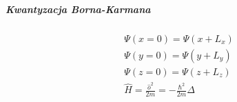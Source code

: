\documentclass{article}
\begin{document}
		\subparagraph{Kwantyzacja Borna-Karmana}
		\begin{equation}
		\begin{array}{cc}
		\Psi(x=0) = \Psi(x+L_x) \\
		\Psi(y = 0) = \Psi(y + L_y) \\
		\Psi(z=0) = \Psi(z + L_z) \\
		\hat{H} = \frac{\hat{o}^2}{2m} = -\frac{\hbar^2}{2m}\Delta
		\end{array}
		\end{equation}
\end{document}
